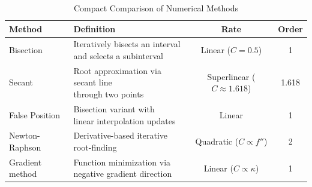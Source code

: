 \begin{table}[htbp]
    \centering
    \begin{tabularx}{\textwidth}{|l|X|c|c|}
        \hline
        \textbf{Method} & \textbf{Definition} & \textbf{Rate} & \textbf{Order} \\
        \hline
        Bisection & 
        \makecell[l]{Iteratively bisects an interval \\ and selects a subinterval} 
        & Linear ($C = 0.5$) & 1 \\
        \hline
        Secant & 
        \makecell[l]{Root approximation via secant line \\ through two points} 
        & Superlinear ($C \approx 1.618$) & 1.618 \\
        \hline
        False Position & 
        \makecell[l]{Bisection variant with \\ linear interpolation updates} 
        & Linear & 1 \\
        \hline
        Newton-Raphson & 
        \makecell[l]{Derivative-based iterative \\ root-finding} 
        & Quadratic ($C \propto f''$) & 2 \\
        \hline
        Gradient method & 
        \makecell[l]{Function minimization via \\ negative gradient direction} 
        & Linear ($C \propto \kappa$) & 1 \\
        \hline
    \end{tabularx}
    \caption{Compact Comparison of Numerical Methods}
    \label{tab:comparison_compact}
\end{table}
